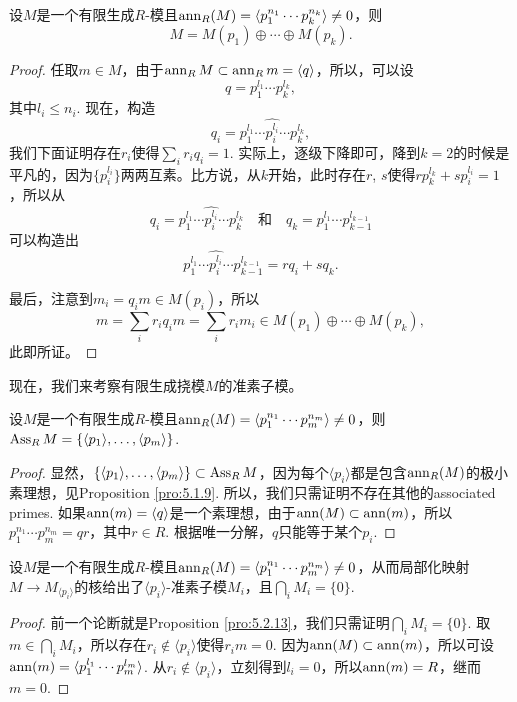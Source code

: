 \begin{pro}
    设$M$是一个有限生成$R$-模且$\operatorname{ann}_R(M)=\langle p_1^{n_1}\cdots p_k^{n_k}\rangle \neq 0$，则
    \[
        M=M(p_1)\oplus \cdots  \oplus M(p_k).
    \]
\end{pro}

\begin{proof}
    任取$m\in M$，由于$\operatorname{ann}_RM\subset \operatorname{ann}_R m=\langle q\rangle$，所以，可以设
    \[
        q=p_1^{l_1}\cdots p_k^{l_k},
    \]
    其中$l_i\leq n_i$. 现在，构造
    \[
    	q_i=p_1^{l_1}\cdots \widehat{p_i^{l_i}}\cdots p_k^{l_k},
    \]
    我们下面证明存在$r_i$使得$\sum_i r_iq_i=1$. 实际上，逐级下降即可，降到$k=2$的时候是平凡的，因为$\{p_i^{l_i}\}$两两互素。比方说，从$k$开始，此时存在$r$, $s$使得$rp_{k}^{l_{k}}+sp_i^{l_i}=1$，所以从
    \[
    q_i=p_1^{l_1}\cdots \widehat{p_i^{l_i}}\cdots p_k^{l_k} \quad\text{和}\quad q_{k}=p_1^{l_1}\cdots p_{k-1}^{l_{k-1}}
    \]
    可以构造出
    \[
    p_1^{l_1}\cdots \widehat{p_i^{l_i}}\cdots p_{k-1}^{l_{k-1}}=rq_i+sq_{k}.
    \]

    最后，注意到$m_i=q_im\in M(p_i)$，所以
    \[
    m=\sum_i r_iq_im=\sum_i r_im_i\in M(p_1)\oplus \cdots  \oplus M(p_k),
    \]
    此即所证。
\end{proof}

现在，我们来考察有限生成挠模$M$的准素子模。

\begin{pro}
    设$M$是一个有限生成$R$-模且$\operatorname{ann}_R(M)=\langle p_1^{n_1}\cdots p_m^{n_m}\rangle \neq 0$，则$\operatorname{Ass}_RM=\{\langle p_1\rangle ,\dots,\langle p_m\rangle \}$.
\end{pro}

\begin{proof}
    显然，$\{\langle p_1\rangle ,\dots,\langle p_m\rangle \}\subset \operatorname{Ass}_RM$，因为每个$\langle p_i\rangle$都是包含$\operatorname{ann}_R(M)$的极小素理想，见Proposition \ref{pro:5.1.9}. 所以，我们只需证明不存在其他的associated primes. 如果$\operatorname{ann}(m)=\langle q\rangle$是一个素理想，由于$\operatorname{ann}(M)\subset \operatorname{ann}(m)$，所以$p_1^{n_1}\cdots p_m^{n_m}=qr$，其中$r\in R$. 根据唯一分解，$q$只能等于某个$p_i$.
\end{proof}

 \begin{pro}
    设$M$是一个有限生成$R$-模且$\operatorname{ann}_R(M)=\langle p_1^{n_1}\cdots p_m^{n_m}\rangle \neq 0$，从而局部化映射$M\to M_{\langle p_i\rangle}$的核给出了$\langle p_i\rangle$-准素子模$M_i$，且$\bigcap_{i}M_i=\{0\}$.
\end{pro}

\begin{proof}
    前一个论断就是Proposition \ref{pro:5.2.13}，我们只需证明$\bigcap_{i}M_i=\{0\}$. 取$m\in \bigcap_{i}M_i$，所以存在$r_i\not\in \langle p_i\rangle$使得$r_im=0$. 因为$\operatorname{ann}(M)\subset \operatorname{ann}(m)$，所以可设$\operatorname{ann}(m)=\langle p_1^{l_1}\cdots p_m^{l_m}\rangle$. 从$r_i\not\in \langle p_i\rangle$，立刻得到$l_i=0$，所以$\operatorname{ann}(m)=R$，继而$m=0$.
\end{proof}

